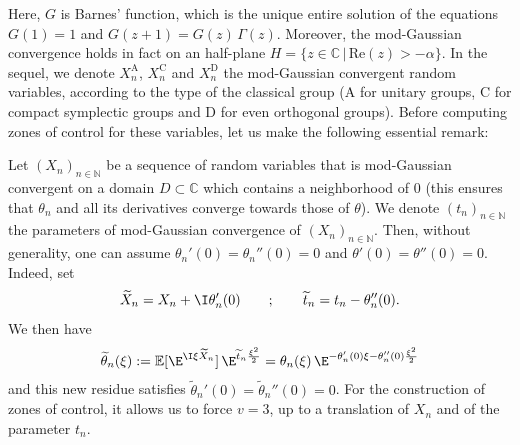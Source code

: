 \documentclass[envcountsame]{svmult}
\newcommand{\N}{\mathbb{N}}
\newcommand{\C}{\mathbb{C}}
\newcommand{\esper}{\mathbb{E}}
\begin{document}
\noindent Here, $G$ is Barnes' function, which is the unique entire solution of the equations $G(1)=1$ and $G(z+1)=G(z)\,\Gamma(z)$. Moreover, the mod-Gaussian convergence holds in fact on an half-plane $H =\{z \in \C\,|\,\mathrm{Re}(z)>-\alpha\}$. In the sequel, we denote $X_n^{\mathrm{A}}$, $X_n^{\mathrm{C}}$ and $X_n^{\mathrm{D}}$ the mod-Gaussian convergent random variables, according to the type of the classical group ($\mathrm{A}$ for unitary groups, $\mathrm{C}$ for compact symplectic groups and $\mathrm{D}$ for even orthogonal groups). Before computing zones of control for these variables, let us make the following essential remark:
\begin{remark}\label{rem:clever}
Let $(X_n)_{n \in \N}$ be a sequence of random variables that is mod-Gaussian convergent on a domain $D \subset \C$ which contains a neighborhood of $0$ (this ensures that $\theta_n$ and all its derivatives converge towards those of $\theta$). We denote $(t_n)_{n\in \N}$ the parameters of mod-Gaussian convergence of $(X_n)_{n \in \N}$. Then, without generality, one can assume $\theta_n'(0)=\theta_n''(0) = 0$ and $\theta'(0)=\theta''(0)=0$. Indeed, set 
$$\widetilde{X}_n = X_n + \I \theta_n'(0) \qquad;\qquad \widetilde{t}_n = t_n - \theta_n''(0).$$
We then have
\begin{align*}
\widetilde{\theta}_n(\xi):=\esper[\E^{\I \xi \widetilde{X}_n}]\, \E^{\widetilde{t}_n\frac{\xi^2}{2}} = \theta_n(\xi)\,\E^{-\theta_n'(0) \xi - \theta_n''(0) \frac{\xi^2}{2}}
\end{align*}
and this new residue satisfies $\widetilde{\theta}_n'(0) = \widetilde{\theta}_n''(0) = 0$. For the construction of zones of control, it allows us to force $v=3$, up to a translation of $X_n$ and of the parameter $t_n$. 
\end{remark}
\end{document}
